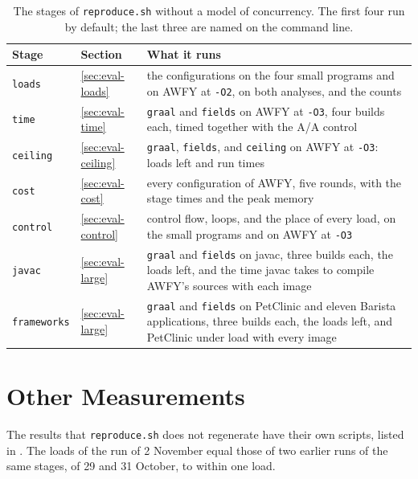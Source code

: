 \begin{table}[t]
    \centering
    \caption{The stages of \texttt{reproduce.sh} without a model of concurrency. The first four run by default; the last
    three are named on the command line.}
    \label{tab:app-stages}
    \small
    \begin{tabular}{llp{6.4cm}}
        \toprule
        Stage & Section & What it runs \\
        \midrule
        \texttt{loads}      & \ref{sec:eval-loads}   & the configurations on the four small programs and on AWFY at \texttt{-O2}, on both analyses, and the counts \\
        \texttt{time}       & \ref{sec:eval-time}    & \texttt{graal} and \texttt{fields} on AWFY at \texttt{-O3}, four builds each, timed together with the A/A control \\
        \texttt{ceiling}    & \ref{sec:eval-ceiling} & \texttt{graal}, \texttt{fields}, and \texttt{ceiling} on AWFY at \texttt{-O3}: loads left and run times \\
        \texttt{cost}       & \ref{sec:eval-cost}    & every configuration of AWFY, five rounds, with the stage times and the peak memory \\
        \texttt{control}    & \ref{sec:eval-control} & control flow, loops, and the place of every load, on the small programs and on AWFY at \texttt{-O3} \\
        \texttt{javac}      & \ref{sec:eval-large}   & \texttt{graal} and \texttt{fields} on javac, three builds each, the loads left, and the time javac takes to compile AWFY's sources with each image \\
        \texttt{frameworks} & \ref{sec:eval-large}   & \texttt{graal} and \texttt{fields} on PetClinic and eleven Barista applications, three builds each, the loads left, and PetClinic under load with every image \\
        \bottomrule
    \end{tabular}
\end{table}

\section{Other Measurements}

The results that \texttt{reproduce.sh} does not regenerate have their own scripts, listed in . The loads
of the run of 2 November equal those of two earlier runs of the same stages, of 29 and 31 October, to within one load.

